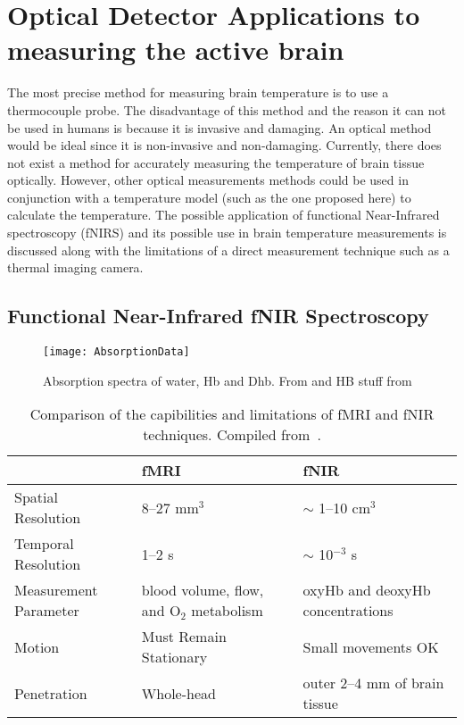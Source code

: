 \chapter{Optical Detector Applications to measuring the active brain}

The most precise method for measuring brain temperature is to use a thermocouple probe.  The disadvantage of this method and the reason it  can not be used in humans is because it is invasive and damaging.  An optical method would be ideal since it is non-invasive and non-damaging.  Currently, there does not exist a method for accurately measuring the temperature of brain tissue optically.  However, other optical measurements methods could be used in conjunction with a temperature model (such as the one proposed here) to calculate the temperature.  The possible application of functional Near-Infrared spectroscopy (fNIRS) and its possible use in brain temperature measurements is discussed along with the limitations of a direct measurement technique such as a thermal imaging camera.
  
\section{{F}unctional {N}ear-{I}nfrared {fNIR} Spectroscopy}
\begin{figure}[tb]
  \begin{center}
    \texttt{[image: AbsorptionData]}
    \caption[Absorption spectra of water, deoxyhemoglobin and oxyhemoblogin]{\label{fig:fnirabsorption} Absorption spectra of water, Hb and Dhb.  From \citet{cope} and HB stuff from \citet{horecker} }
  \end{center}
\end{figure}
\begin{table*}[tb]
  \begin{tabular*}{\linewidth}{lp{5cm}p{5cm}}
    \toprule
                         & fMRI             & fNIR            \\
    \midrule
    Spatial Resolution   & 8--27 mm$^3$  & $\sim$ 1--10 cm$^3$ \\
    Temporal Resolution  & 1--2 s        & $\sim$ 10$^{-3}$ s \\
    Measurement Parameter& blood volume, flow, and O$_2$ metabolism & oxyHb and deoxyHb concentrations \\
    Motion               & Must Remain Stationary & Small movements OK \\
    Penetration          & Whole-head    & outer 2--4 mm of brain tissue \\
    \bottomrule
  \end{tabular*}
  \caption[Comparison of fMRI and fNIR]{\label{tbl:comaparemethods}Comparison of the capibilities and limitations of fMRI and fNIR techniques.  Compiled from~\citet{bunce2006,elliott}.}
\end{table*}

